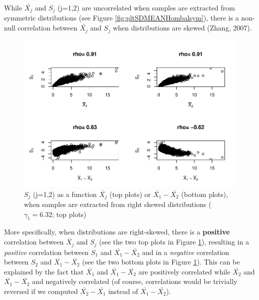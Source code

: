 \documentclass[
  man]{apa6}
\begin{document}
While \(\bar{X_j}\) and \(S_j\) (j=1,2) are uncorrelated when samples are extracted from symmetric distributions (see Figure \ref{fig:pltSDMEANHombalsym}), there is a non-null correlation between \(\bar{X_j}\) and \(S_j\) when distributions are skewed (Zhang, 2007).

\begin{figure}
\centering
\includegraphics{Correlations-between-the-sample-means-difference-and-standardizers-of-all-estimators,-and-implications-on-biases-and-variances-of-all-estimators_files/figure-latex/pltSDHombalRskew-1.pdf}
\caption{\label{fig:pltSDHombalRskew}\(S_j\) (j=1,2) as a function \(\bar{X_j}\) (top plots) or \(\bar{X_1}-\bar{X_2}\) (bottom plots), when samples are extracted from right skewed distributions (\(\gamma_1 = 6.32\); top plots)}
\end{figure}

More specifically, when distributions are right-skewed, there is a \textbf{positive} correlation between \(\bar{X_j}\) and \(S_j\) (see the two top plots in Figure \ref{fig:pltSDHombalRskew}), resulting in a \emph{positive} correlation between \(S_1\) and \(\bar{X_1}-\bar{X_2}\) and in a \emph{negative} correlation between \(S_2\) and \(\bar{X_1}-\bar{X_2}\) (see the two bottom plots in Figure \ref{fig:pltSDHombalRskew}). This can be explained by the fact that \(\bar{X_1}\) and \(\bar{X_1}-\bar{X_2}\) are positively correlated while \(\bar{X_2}\) and \(\bar{X_1}-\bar{X_2}\) and negatively correlated (of course, correlations would be trivially reversed if we computed \(\bar{X_2}-\bar{X_1}\) instead of \(\bar{X_1}-\bar{X_2}\)).
\end{document}
